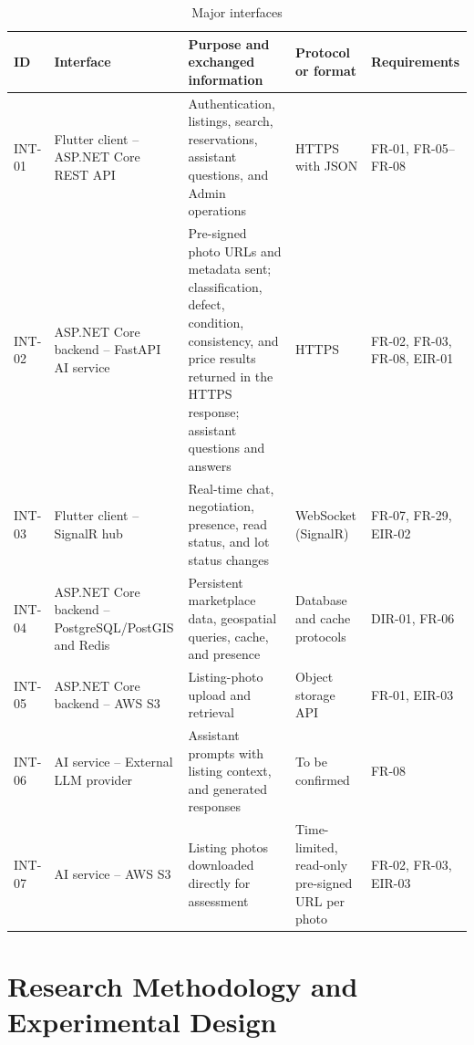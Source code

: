 \begin{table}[H]
\centering
\caption{Major interfaces}
\label{tab:major-interfaces}
\small
\setlength{\tabcolsep}{3pt}
\begin{tabularx}{\textwidth}{@{}>{\raggedright\arraybackslash}p{}>{\raggedright\arraybackslash}p{}>{\raggedright\arraybackslash}X>{\raggedright\arraybackslash}p{}>{\raggedright\arraybackslash}p{}@{}}
\toprule
\textbf{ID} & \textbf{Interface} & \textbf{Purpose and exchanged information} & \textbf{Protocol or format} & \textbf{Requirements} \\
\midrule
INT-01 & Flutter client -- ASP.NET Core REST API & Authentication, listings, search, reservations, assistant questions, and Admin operations & HTTPS with JSON & FR-01, \mbox{FR-05--FR-08} \\
INT-02 & ASP.NET Core backend -- FastAPI AI service & Pre-signed photo URLs and metadata sent; classification, defect, condition, consistency, and price results returned in the HTTPS response; assistant questions and answers & HTTPS & FR-02, FR-03, FR-08, EIR-01 \\
INT-03 & Flutter client -- SignalR hub & Real-time chat, negotiation, presence, read status, and lot status changes & WebSocket (SignalR) & FR-07, FR-29, EIR-02 \\
INT-04 & ASP.NET Core backend -- PostgreSQL/\allowbreak PostGIS and Redis & Persistent marketplace data, geospatial queries, cache, and presence & Database and cache protocols & DIR-01, FR-06 \\
INT-05 & ASP.NET Core backend -- AWS S3 & Listing-photo upload and retrieval & Object storage API & FR-01, EIR-03 \\
INT-06 & AI service -- External LLM provider & Assistant prompts with listing context, and generated responses & To be confirmed & FR-08 \\
INT-07 & AI service -- AWS S3 & Listing photos downloaded directly for assessment & Time-limited, read-only pre-signed URL per photo & FR-02, FR-03, EIR-03 \\
\bottomrule
\end{tabularx}
\end{table}

\section{Research Methodology and Experimental Design }
\label{sec:research-methodology}

